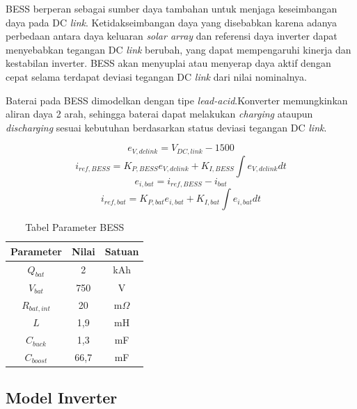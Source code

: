 BESS berperan sebagai sumber daya tambahan untuk menjaga keseimbangan daya pada DC \textit{link}. Ketidakseimbangan daya yang disebabkan karena adanya perbedaan antara daya keluaran \textit{solar array} dan referensi daya inverter dapat menyebabkan tegangan DC \textit{link} berubah, yang dapat mempengaruhi kinerja dan kestabilan inverter. BESS akan menyuplai atau menyerap daya aktif dengan cepat selama terdapat deviasi tegangan DC \textit{link} dari nilai nominalnya. 

Baterai pada BESS dimodelkan dengan tipe \textit{lead-acid}.Konverter memungkinkan aliran daya 2 arah, sehingga baterai dapat melakukan \textit{charging} ataupun \textit{discharging} sesuai kebutuhan berdasarkan status deviasi tegangan DC \textit{link}.

\begin{equation}
	\mathit{e_{V,dclink}} = V_{DC,link} - 1500
\end{equation}
\begin{equation}
	\mathit{i_{ref,BESS}} = K_{P,BESS}e_{V,dclink} + K_{I,BESS}\int e_{V,dclink}dt
\end{equation}
\begin{equation}
	\mathit{e_{i,bat}} = i_{ref,BESS} - i_{bat}
\end{equation}
\begin{equation}
	\mathit{i_{ref,bat}} = K_{P,bat}e_{i,bat} + K_{I,bat}\int e_{i,bat}dt
\end{equation}

\begin{table}[ht]
	\caption{Tabel Parameter BESS}
	\vspace{0.5em}
	\centering
	\begin{tabular}{|c|c|c|}
		\hline
		Parameter & Nilai & Satuan \\
		\hline
		$\mathit{Q_{bat}}$ & 2 & kAh \\
		$\mathit{V_{bat}}$ & 750 & V \\
		$\mathit{R_{bat,int}}$ & 20 & m$\Omega$ \\
		$\mathit{L}$ & 1,9 & mH \\
		$\mathit{C_{buck}}$ & 1,3 & mF \\
		$\mathit{C_{boost}}$ & 66,7 & mF \\
		\hline
	\end{tabular}
	\label{Tab: tabel bess}
\end{table}



\subsection{Model Inverter}

